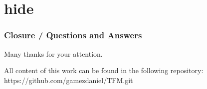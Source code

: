 \section*{hide}

\begin{frame}
\frametitle{Closure / Questions and Answers}

\begin{center}
Many thanks for your attention.\\

\vspace{1cm}

All content of this work can be found in the following repository:\\
https://github.com/gamezdaniel/TFM.git

\end{center}
\end{frame}
